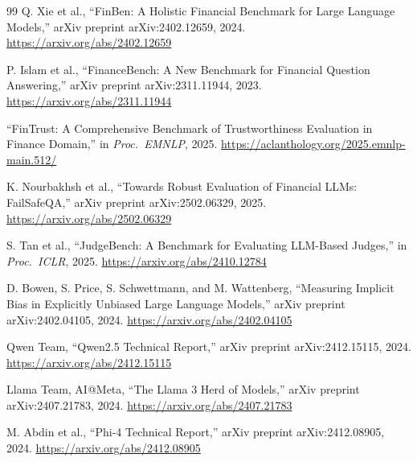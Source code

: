 \documentclass[11pt,a4paper]{article}
\begin{document}
\begin{thebibliography}{99}
 Q. Xie et al., ``FinBen: A Holistic Financial Benchmark for Large Language Models,'' arXiv preprint arXiv:2402.12659, 2024. \url{https://arxiv.org/abs/2402.12659}

 P. Islam et al., ``FinanceBench: A New Benchmark for Financial Question Answering,'' arXiv preprint arXiv:2311.11944, 2023. \url{https://arxiv.org/abs/2311.11944}

 ``FinTrust: A Comprehensive Benchmark of Trustworthiness Evaluation in Finance Domain,'' in \emph{Proc.\ EMNLP}, 2025. \url{https://aclanthology.org/2025.emnlp-main.512/}

 K. Nourbakhsh et al., ``Towards Robust Evaluation of Financial LLMs: FailSafeQA,'' arXiv preprint arXiv:2502.06329, 2025. \url{https://arxiv.org/abs/2502.06329}

 S. Tan et al., ``JudgeBench: A Benchmark for Evaluating LLM-Based Judges,'' in \emph{Proc.\ ICLR}, 2025. \url{https://arxiv.org/abs/2410.12784}

 D. Bowen, S. Price, S. Schwettmann, and M. Wattenberg, ``Measuring Implicit Bias in Explicitly Unbiased Large Language Models,'' arXiv preprint arXiv:2402.04105, 2024. \url{https://arxiv.org/abs/2402.04105}

 Qwen Team, ``Qwen2.5 Technical Report,'' arXiv preprint arXiv:2412.15115, 2024. \url{https://arxiv.org/abs/2412.15115}

 Llama Team, AI@Meta, ``The Llama 3 Herd of Models,'' arXiv preprint arXiv:2407.21783, 2024. \url{https://arxiv.org/abs/2407.21783}

 M. Abdin et al., ``Phi-4 Technical Report,'' arXiv preprint arXiv:2412.08905, 2024. \url{https://arxiv.org/abs/2412.08905}

\end{thebibliography}
\end{document}
